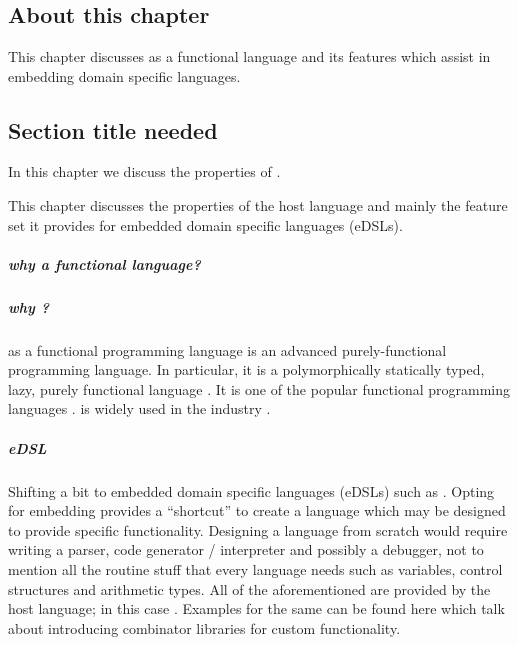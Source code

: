 \documentclass[thesis-solanki.tex]{subfiles}
\begin{document}
\chapter{}\label{chap:hwh}


\section{About this chapter}
This chapter discusses  as a functional language and its features which assist in embedding domain specific languages.


\section{Section title needed}


In this chapter we discuss the properties of .

This chapter discusses the properties of the host language  and mainly the feature set it
provides for embedded domain specific languages (eDSLs).


\paragraph{why a functional language?}

\paragraph{why ?}
 as a functional programming language  is an advanced purely-functional programming
  language.
  In particular, it is a polymorphically statically typed, lazy, purely functional language
  \cite{website:haskellwiki}.
  It is one of the popular functional programming languages \cite{website:langpop}.
   is widely used in the industry \cite{website:haskellinindustry}.

\paragraph{eDSL}
  Shifting a bit to embedded domain specific languages (eDSLs) such as .
  Opting for embedding provides a ``shortcut'' to create a language which may be designed to provide specific
  functionality.
  Designing a language from scratch would require writing a parser, code generator / interpreter and possibly a
  debugger, not to mention all the routine stuff that every language
  needs such as variables, control structures and 
  arithmetic types.
  All of the aforementioned are provided by the host language; in this case .
  Examples for the same can be found here \cite{jones2001composing, meyer2008eiffel} which talk about introducing
  combinator libraries for custom functionality.
\end{document}
